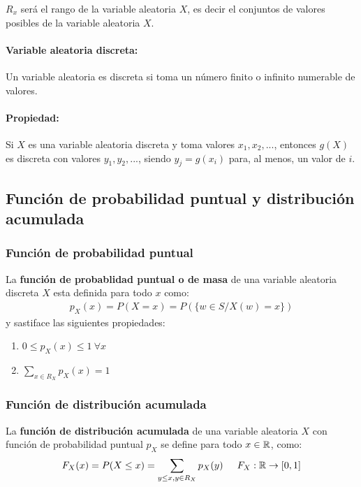 $R_x$ será el rango de la variable aleatoria $X$, es decir el conjuntos de valores posibles	de la variable aleatoria $X$.

\paragraph{Variable aleatoria discreta:} Un variable aleatoria es discreta 	si toma un número finito o infinito numerable de valores.

\paragraph{Propiedad:} Si $X$ es una variable aleatoria discreta y toma valores $x_1,x_2,...$, entonces $g(X)$ es discreta con valores $y_1,y_2,...$, siendo $y_j = g(x_i)$ para, al menos, un valor de $i$.

\subsection{Función de probabilidad puntual y distribución acumulada}
\subsubsection{Función de probabilidad puntual}
La \textbf{función de probablidad puntual o de masa} de una variable aleatoria discreta $X$ esta definida para todo $x$ como:
\begin{align*}
p_X(x)=P(X=x)=P(\{w\in S / X(w)=x\})
\end{align*}
y sastiface las siguientes propiedades:
\begin{enumerate}
\item $0 \leq p_X(x) \leq 1 ~ \forall x$
\item $\sum_{x\in R_X} p_X(x)=1$
\end{enumerate}

\subsubsection{Función de distribución acumulada}
La	\textbf{función de distribución acumulada} de una variable aleatoria $X$ con función de probabilidad puntual $p_X$ se define para todo $x\in\mathbb{R}$, como:
	\begin{align*}
		F_X(x) = P(X\leq x) = \sum_{y\leq x, y\in R_X} p_X(y) \hspace{5mm} F_X : \mathbb{R} \rightarrow [0,1]
	\end{align*}
	
